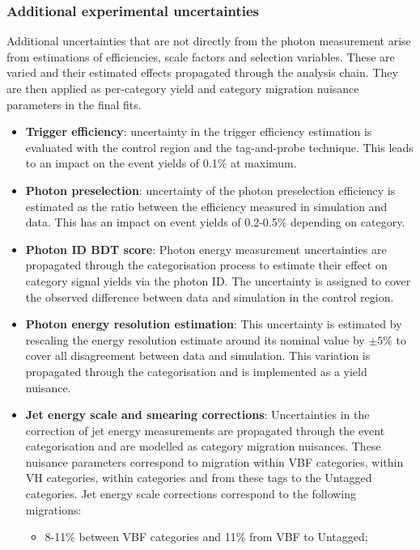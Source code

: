 \subsubsection{Additional experimental uncertainties}
Additional uncertainties that are not directly from the photon measurement arise from estimations of efficiencies, scale factors and selection variables. These are varied and their estimated effects propagated through the analysis chain. They are then applied as per-category yield and category migration nuisance parameters in the final fits. 
\begin{itemize}[noitemsep]
    \item {\textbf{Trigger efficiency}: 
           uncertainty in the trigger efficiency estimation is evaluated with the \Zee control region and the tag-and-probe technique. This leads to an impact on the event yields of 0.1\% at maximum.}
    \item {\textbf{Photon preselection}: 
           uncertainty of the photon preselection efficiency is estimated as the ratio between the efficiency measured in simulation and data. This has an impact on event yields of 0.2-0.5\% depending on category.}
    \item {\textbf{Photon ID BDT score}: 
           Photon energy measurement uncertainties are propagated through the categorisation process to estimate their effect on category signal yields via the photon ID. The uncertainty is assigned to cover the observed difference between data and simulation in the \Zee control region. 
           }
    \item {\textbf{Photon energy resolution estimation}: 
        This uncertainty is estimated by rescaling the energy resolution estimate around its nominal value by $\pm{5}\%$ to cover all disagreement between data and simulation. This variation is propagated through the categorisation and is implemented as a yield nuisance. 
           }
    \item {\textbf{Jet energy scale and smearing corrections}: 
           Uncertainties in the correction of jet energy measurements are propagated through the event categorisation and are modelled as category migration nuisances. 
           These nuisance parameters correspond to migration within VBF categories, within VH categories, within \ttH categories and from these tags to the Untagged categories. 
           Jet energy scale corrections correspond to the following migrations: 
           \begin{itemize}[noitemsep]
               \item[\textbullet] 8-11\% between VBF categories and 11\% from VBF to Untagged;

\end{itemize}}
\end{itemize}
